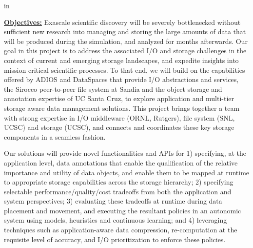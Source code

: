 \documentclass[11pt,letterpaper]{article}
\begin{document}
\setlength{\parindent}{0.5cm}

 in


\underline{\textbf{Objectives:}} Exascale scientific discovery will be
severely bottlenecked without sufficient new research into managing and
storing the large amounts of data that will be produced during the
simulation, and analyzed for months afterwards.  Our goal in this project is
to address the associated I/O and storage challenges in the context of
current and emerging storage landscapes, and expedite insights into mission
critical scientific processes. To that end, we will build on the
capabilities offered by ADIOS and DataSpaces that provide I/O abstractions
and services, the Sirocco peer-to-peer file system at
Sandia and the object storage and annotation expertise of UC Santa Cruz, to
explore application and multi-tier storage aware data management
solutions.    This project
brings together a  team with strong expertise in I/O middleware (ORNL,
Rutgers), file system (SNL, UCSC) and storage (UCSC), and connects and
coordinates these key storage components in a seamless fashion.

Our solutions will provide novel functionalities and APIs for
\setlength{\parindent}{0cm}
1) specifying, at the application level, data annotations that enable the
qualification of the relative importance and utility of data objects, and
enable them to be mapped at runtime to appropriate storage capabilities
across the storage hierarchy;
%
2) specifying selectable performance/quality/cost tradeoffs from both the
application and system perspectives;
%
3) evaluating these tradeoffs at runtime during data placement and movement,
and executing the resultant policies in an autonomic system using models,
heuristics and continuous learning; and
%
4) leveraging techniques such as application-aware data compression, re-computation at the
requisite level of accuracy, and I/O prioritization to enforce these
policies.
  
  \setlength{\parindent}{0.5cm}
  
\end{document}
